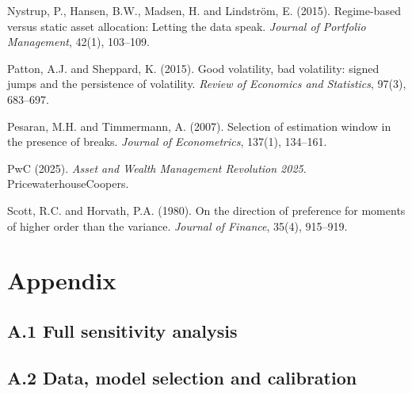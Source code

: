 \documentclass[11pt, a4paper]{article}
\newcommand{\new}[1]{#1}
\newcommand{\reftgt}[1]{\hypertarget{ref:#1}{}}
\begin{document}
\begin{description}[leftmargin=2em, itemsep=2pt]
\item \reftgt{nystrup2015} Nystrup, P., Hansen, B.W., Madsen, H. and Lindstr{\"o}m, E. (2015). Regime-based
  versus static asset allocation: Letting the data speak.
  \textit{Journal of Portfolio Management}, 42(1), 103--109.

\new{\item \reftgt{patton2015} Patton, A.J. and Sheppard, K. (2015). Good volatility, bad volatility: signed jumps
  and the persistence of volatility. \textit{Review of Economics and Statistics}, 97(3),
  683--697.}

\item \reftgt{pesaran2007} Pesaran, M.H. and Timmermann, A. (2007). Selection of estimation window in the
  presence of breaks. \textit{Journal of Econometrics}, 137(1), 134--161.

\item \reftgt{pwc2025}PwC (2025). \textit{Asset and Wealth Management Revolution 2025}.
  PricewaterhouseCoopers.

\item \reftgt{scott1980} Scott, R.C. and Horvath, P.A. (1980). On the direction of preference for moments of
  higher order than the variance. \textit{Journal of Finance}, 35(4), 915--919.

\end{description}

\clearpage
\appendix
\section{Appendix}
\label{sec:appendix_all}

\subsection*{A.1 Full sensitivity analysis}



\subsection*{A.2 Data, model selection and calibration}
\end{document}
